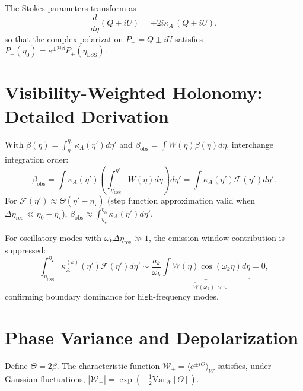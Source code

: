 \documentclass[12pt]{article}
\theoremstyle{definition}
\newcommand{\kA}{\kappa_A}
\newcommand{\Wrec}{\Delta\eta_{\mathrm{rec}}}
\newcommand{\betaobs}{\beta_{\mathrm{obs}}}
\newcommand{\etaLSS}{\eta_{\mathrm{LSS}}}
\newcommand{\etastar}{\eta_\star}
\newcommand{\etaobs}{\eta_0}
\newcommand{\Wpm}{\mathcal{W}_\pm}
\newcommand{\VarW}{\mathrm{Var}_W}
\begin{document}
The Stokes parameters transform as
\begin{equation}
  \frac{d}{d\eta}(Q\pm iU) = \pm 2i\kA\,(Q\pm iU),
\end{equation}
so that the complex polarization $P_\pm=Q\pm iU$ satisfies
$P_\pm(\eta_0)=e^{\pm2i\beta}P_\pm(\etaLSS)$.

\section{Visibility-Weighted Holonomy: Detailed Derivation}
\label{app:visibility}

With $\beta(\eta)=\int_\eta^{\etaobs}\kA(\eta')d\eta'$ and
$\betaobs=\int W(\eta)\beta(\eta)d\eta$, interchange integration order:
\begin{equation}
  \betaobs
  = \int\kA(\eta')\left(\int_{\etaLSS}^{\eta'}W(\eta)d\eta\right)d\eta'
  = \int\kA(\eta')\mathcal{F}(\eta')d\eta'.
\end{equation}
For $\mathcal{F}(\eta')\approx\Theta(\eta'-\etastar)$
(step function approximation valid when $\Wrec\ll\eta_0-\etastar$),
$\betaobs\approx\int_{\etastar}^{\etaobs}\kA(\eta')d\eta'$.

For oscillatory modes with $\omega_k\Wrec\gg1$,
the emission-window contribution is suppressed:
\begin{equation}
  \int_{\etaLSS}^{\etastar}\kA^{(k)}(\eta')\mathcal{F}(\eta')d\eta'
  \sim \frac{a_k}{\omega_k}
       \underbrace{\int W(\eta)\cos(\omega_k\eta)d\eta}_{=\,\widetilde{W}(\omega_k)\,\approx\,0}
  = 0,
\end{equation}
confirming boundary dominance for high-frequency modes.

\section{Phase Variance and Depolarization}
\label{app:variance}

Define $\Theta=2\beta$.
The characteristic function
$\Wpm=\langle e^{\pm i\Theta}\rangle_W$
satisfies, under Gaussian fluctuations,
$|\Wpm|=\exp(-\tfrac{1}{2}\VarW[\Theta])$.
\end{document}
